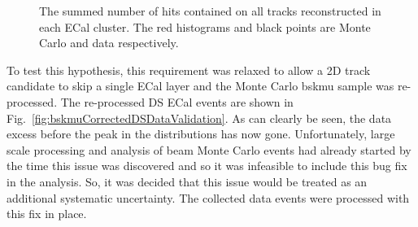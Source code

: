 \begin{figure}%
  \centering
  \hspace{1em}
  \caption{The summed number of hits contained on all tracks reconstructed in each ECal cluster.  The red histograms and black points are Monte Carlo and data respectively.}
  \label{fig:TotalHitsDataValidation}
\end{figure}
\newline
\newline
To test this hypothesis, this requirement was relaxed to allow a 2D track candidate to skip a single ECal layer and the Monte Carlo bskmu sample was re-processed.  The re-processed DS ECal events are shown in Fig.~\ref{fig:bskmuCorrectedDSDataValidation}.  As can clearly be seen, the data excess before the peak in the distributions has now gone.  Unfortunately, large scale processing and analysis of beam Monte Carlo events had already started by the time this issue was discovered and so it was infeasible to include this bug fix in the analysis.  So, it was decided that this issue would be treated as an additional systematic uncertainty.  The collected data events were processed with this fix in place.
